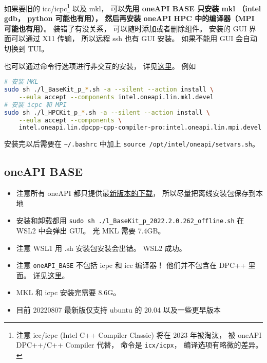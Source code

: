 

如果要旧的 icc/icpc\footnote{注意 icc/icpc (Intel C++ Compiler Classic) 将在 2023 年被淘汰， 被 oneAPI DPC++/C++ Compiler 代替， 命令是 \verb|icx/icpx|， 编译选项有略微的差异。} 以及 mkl， 可以\textbf{先用 oneAPI BASE 只安装 mkl （intel gdb， python 可能也有用）， 然后再安装 oneAPI HPC 中的编译器（MPI 可能也有用）}。
装错了有没关系， 可以随时添加或者删除组件。 安装的 GUI 界面可以通过 X11 传输， 所以远程 ssh 也有 GUI 安装。 如果不能用 GUI 会自动切换到 TUI。

也可以通过命令行选项进行非交互的安装， 详见\href{https://www.intel.com/content/www/us/en/develop/documentation/installation-guide-for-intel-oneapi-toolkits-linux/top/installation/install-with-command-line.html#install-with-command-line}{这里}。 例如
\begin{lstlisting}[language=bash]
# 安装 MKL
sudo sh ./l_BaseKit_p_*.sh -a --silent --action install \
    --eula accept --components intel.oneapi.lin.mkl.devel
# 安装 icpc 和 MPI
sudo sh ./l_HPCKit_p_*.sh -a --silent --action install \
    --eula accept --components \
    intel.oneapi.lin.dpcpp-cpp-compiler-pro:intel.oneapi.lin.mpi.devel
\end{lstlisting}

安装完以后需要在 \verb|~/.bashrc| 中加上 \verb|source /opt/intel/oneapi/setvars.sh|。

\subsection{oneAPI BASE}
\begin{itemize}
\item 注意所有 oneAPI 都只提供最\href{https://www.intel.com/content/www/us/en/developer/tools/oneapi/base-toolkit-download.html?operatingsystem=linux&distributions=webdownload&options=offline}{新版本的下载}， 所以尽量把离线安装包保存到本地
\item 安装和卸载都用 \verb`sudo sh ./l_BaseKit_p_2022.2.0.262_offline.sh` 在 WSL2 中会弹出 GUI。 光 MKL 需要 7.4GB。
\item 注意 WSL1 用 .sh 安装包安装会出错。 WSL2 成功。
\item 注意 \verb|oneAPI_BASE| 不包括 icpc 和 icc 编译器！ 他们并不包含在 DPC++ 里面。 \href{https://stackoverflow.com/questions/66527842/can-not-find-the-icc-compiler-after-having-installed-intel-oneapi-invoking-from}{详见这里}。
\item MKL 和 icpc 安装完需要 8.6G。
\item 目前 20220807 最新版仅支持 ubuntu 的 20.04 以及一些更早版本
\end{itemize}


